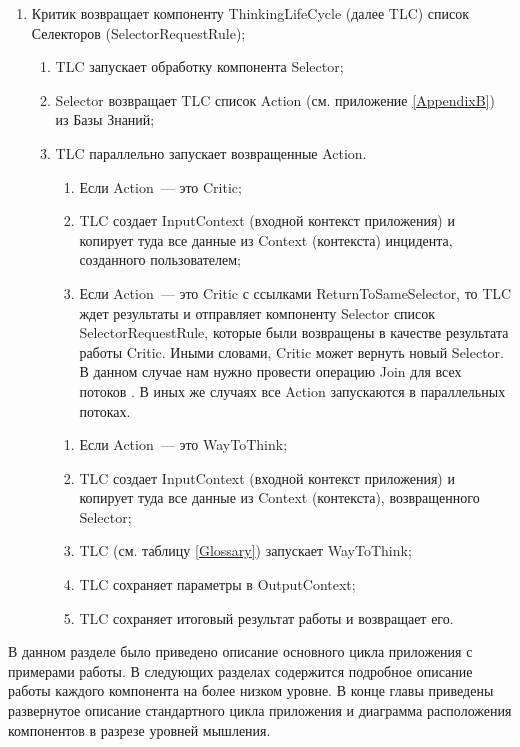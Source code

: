 \begin{enumerate}
	\item Критик возвращает компоненту ThinkingLifeCycle (далее TLC) список Селекторов (SelectorRequestRule);
	\begin{enumerate}
	\item TLC запускает обработку компонента Selector;
	\item Selector возвращает TLC список Action (см. приложение \ref{AppendixB}) из Базы Знаний;
	\item TLC параллельно запускает возвращенные Action.
	\begin{enumerate}
	\item Если Action~--- это Critic;
	\item TLC создает InputContext (входной контекст приложения) и копирует туда все данные из Context (контекста) инцидента, созданного пользователем;
	\item Если Action~--- это Critic с ссылками ReturnToSameSelector, то TLC ждет результаты и отправляет компоненту Selector список SelectorRequestRule, которые были возвращены в качестве результата работы Critic. Иными словами, Critic может вернуть новый Selector. В данном случае нам нужно провести операцию Join для всех потоков \cite{JavaConcurrency}. В иных же случаях все Action запускаются в параллельных потоках.
	\end{enumerate} 
	\begin{enumerate}
	\item Если Action~--- это WayToThink;
	\item TLC создает InputContext (входной контекст приложения) и копирует туда все данные из Context (контекста), возвращенного Selector;
	\item TLC (см. таблицу \ref{Glossary}) запускает WayToThink;
	\item TLC сохраняет параметры в OutputContext;
	\item TLC сохраняет итоговый результат работы и возвращает его. 
	\end{enumerate} 
	\end{enumerate}
\end{enumerate} \par
В данном разделе было приведено описание основного цикла приложения с примерами работы. В следующих разделах содержится подробное описание работы каждого компонента на более низком уровне. В конце главы приведены развернутое описание стандартного цикла приложения и диаграмма расположения компонентов в разрезе уровней мышления.

